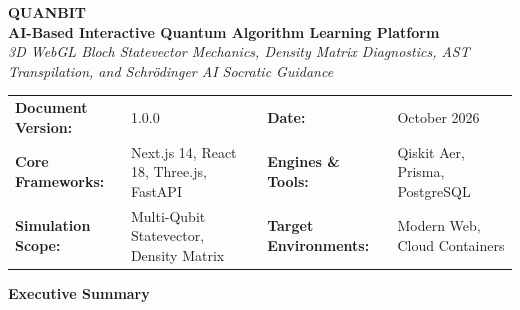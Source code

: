 \documentclass[11pt, a4paper]{article}
\begin{document}
\thispagestyle{empty}

\begin{center}
	\vspace*{0.3cm}
	{\Huge\textbf{\textsf{QUANBIT}}}\\[8pt]
	{\Large\textbf{AI-Based Interactive Quantum Algorithm Learning Platform}}\\[6pt]
	{\large\textit{3D WebGL Bloch Statevector Mechanics, Density Matrix Diagnostics, AST Transpilation, and Schr{\"o}dinger AI Socratic Guidance}}\\[18pt]
\end{center}

\noindent\begin{tabularx}{\textwidth}{@{}p{3.4cm}X p{3.6cm}X@{}}
\toprule
\textbf{Document Version:} & 1.0.0 & \textbf{Date:} & October 2026 \\
\textbf{Core Frameworks:} & Next.js 14, React 18, Three.js, FastAPI & \textbf{Engines \& Tools:} & Qiskit Aer, Prisma, PostgreSQL \\
\textbf{Simulation Scope:} & Multi-Qubit Statevector, Density Matrix & \textbf{Target Environments:} & Modern Web, Cloud Containers \\
\bottomrule
\end{tabularx}

\vspace{0.6cm}
\begin{center}
	{\large\textbf{Executive Summary}}
\end{center}
\vspace{0.2cm}
\end{document}
